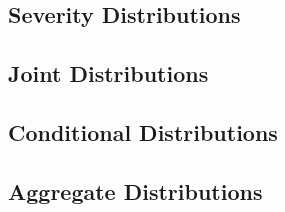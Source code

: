\documentclass[english]{article}
\newcommand\Tstrut{\rule{0pt}{2.6ex}}         %
\begin{document}
\begin{multicols*}{2}
\subsection{Severity Distributions}\label{subsec:0sevDistr}


\subsection{Joint Distributions}\label{subsec:0jointDistr}
\subsection{Conditional Distributions}\label{subsec:0condDistr}
\subsection{Aggregate Distributions}\label{subsec:0aggDistr}

\end{multicols*}
\end{document}
